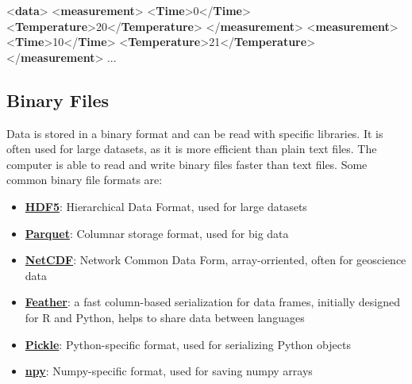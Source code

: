 \documentclass[
  letterpaper,
  DIV=11,
  numbers=noendperiod]{scrreprt}
\newenvironment{Shaded}{\begin{snugshade}}{\end{snugshade}}
\newcommand{\KeywordTok}[1]{\textcolor[rgb]{0.00,0.23,0.31}{\textbf{#1}}}
\newcommand{\NormalTok}[1]{\textcolor[rgb]{0.00,0.23,0.31}{#1}}
\begin{document}
\begin{Shaded}
\begin{Highlighting}[]
\NormalTok{\textless{}}\KeywordTok{data}\NormalTok{\textgreater{}}
\NormalTok{  \textless{}}\KeywordTok{measurement}\NormalTok{\textgreater{}}
\NormalTok{    \textless{}}\KeywordTok{Time}\NormalTok{\textgreater{}0\textless{}/}\KeywordTok{Time}\NormalTok{\textgreater{}}
\NormalTok{    \textless{}}\KeywordTok{Temperature}\NormalTok{\textgreater{}20\textless{}/}\KeywordTok{Temperature}\NormalTok{\textgreater{}}
\NormalTok{  \textless{}/}\KeywordTok{measurement}\NormalTok{\textgreater{}}
\NormalTok{  \textless{}}\KeywordTok{measurement}\NormalTok{\textgreater{}}
\NormalTok{    \textless{}}\KeywordTok{Time}\NormalTok{\textgreater{}10\textless{}/}\KeywordTok{Time}\NormalTok{\textgreater{}}
\NormalTok{    \textless{}}\KeywordTok{Temperature}\NormalTok{\textgreater{}21\textless{}/}\KeywordTok{Temperature}\NormalTok{\textgreater{}}
\NormalTok{  \textless{}/}\KeywordTok{measurement}\NormalTok{\textgreater{}}
\NormalTok{  ...}
\end{Highlighting}
\end{Shaded}

\subsection*{Binary Files}\label{binary-files}

Data is stored in a binary format and can be read with specific
libraries. It is often used for large datasets, as it is more efficient
than plain text files. The computer is able to read and write binary
files faster than text files. Some common binary file formats are:

\begin{itemize}
\item
  \href{https://en.wikipedia.org/wiki/Hierarchical_Data_Format}{\textbf{HDF5}}:
  Hierarchical Data Format, used for large datasets
\item
  \href{https://en.wikipedia.org/wiki/Apache_Parquet}{\textbf{Parquet}}:
  Columnar storage format, used for big data
\item
  \href{https://en.wikipedia.org/wiki/NetCDF}{\textbf{NetCDF}}: Network
  Common Data Form, array-orriented, often for geoscience data
\item
  \href{https://arrow.apache.org/docs/python/feather.html}{\textbf{Feather}}:
  a fast column-based serialization for data frames, initially designed
  for R and Python, helps to share data between languages
\item
  \href{https://docs.python.org/3/library/pickle.html}{\textbf{Pickle}}:
  Python-specific format, used for serializing Python objects
\item
  \href{https://numpy.org/doc/stable/reference/generated/numpy.lib.format.html}{\textbf{npy}}:
  Numpy-specific format, used for saving numpy arrays
\end{itemize}
\end{document}
